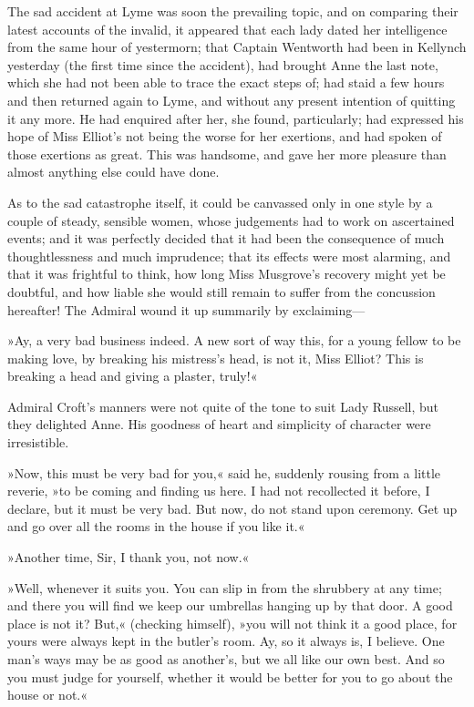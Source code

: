 The sad accident at Lyme was soon the prevailing topic, and on comparing their latest accounts of the invalid, it appeared that each lady dated her intelligence from the same hour of yestermorn; that Captain Wentworth had been in Kellynch yesterday (the first time since the accident), had brought Anne the last note, which she had not been able to trace the exact steps of; had staid a few hours and then returned again to Lyme, and without any present intention of quitting it any more. He had enquired after her, she found, particularly; had expressed his hope of Miss Elliot's not being the worse for her exertions, and had spoken of those exertions as great. This was handsome, and gave her more pleasure than almost anything else could have done.

As to the sad catastrophe itself, it could be canvassed only in one style by a couple of steady, sensible women, whose judgements had to work on ascertained events; and it was perfectly decided that it had been the consequence of much thoughtlessness and much imprudence; that its effects were most alarming, and that it was frightful to think, how long Miss Musgrove's recovery might yet be doubtful, and how liable she would still remain to suffer from the concussion hereafter! The Admiral wound it up summarily by exclaiming—

»Ay, a very bad business indeed. A new sort of way this, for a young fellow to be making love, by breaking his mistress's head, is not it, Miss Elliot? This is breaking a head and giving a plaster, truly!«

Admiral Croft's manners were not quite of the tone to suit Lady Russell, but they delighted Anne. His goodness of heart and simplicity of character were irresistible.

»Now, this must be very bad for you,« said he, suddenly rousing from a little reverie, »to be coming and finding us here. I had not recollected it before, I declare, but it must be very bad. But now, do not stand upon ceremony. Get up and go over all the rooms in the house if you like it.«

»Another time, Sir, I thank you, not now.«

»Well, whenever it suits you. You can slip in from the shrubbery at any time; and there you will find we keep our umbrellas hanging up by that door. A good place is not it? But,« (checking himself), »you will not think it a good place, for yours were always kept in the butler's room. Ay, so it always is, I believe. One man's ways may be as good as another's, but we all like our own best. And so you must judge for yourself, whether it would be better for you to go about the house or not.«

